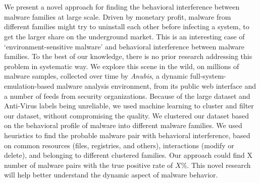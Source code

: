 \chapter{\abstractname}
We present a novel approach for finding the behavioral interference between malware families at large scale.
Driven by monetary profit, malware from different families might try to uninstall each other before infecting a system, to get the larger share on the underground market.
This is an interesting case of `environment-sensitive malware' and behavioral interference between malware families.
To the best of our knowledge, there is no prior research addressing this problem in systematic way.
We explore this scene in the wild, on millions of malware samples, collected over time by \emph{Anubis}, a dynamic full-system-emulation-based malware analysis environment, from its public web interface and a number of feeds from security organizations.
Because of the large dataset and Anti-Virus labels being unreliable, we used machine learning to cluster and filter our dataset, without compromising the quality.
We clustered our dataset based on the behavioral profile of malware into different malware families.
We used heuristics to find the probable malware pair with behavioral interference, based on common resources (files, registries, and others), interactions (modify or delete), and belonging to different clustered families.
Our approach could find X number of malware pairs with the true positive rate of $X\%$.
This novel research will help better understand the dynamic aspect of malware behavior.

